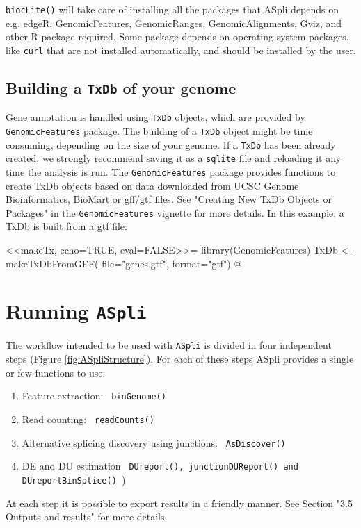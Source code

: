 \documentclass{article}
\begin{document}
\texttt{biocLite()} will take care of installing all the packages that ASpli 
depends on e.g. edgeR, GenomicFeatures, GenomicRanges, GenomicAlignments, Gviz, 
and other R package required. Some package depends on operating system packages,
like \texttt{curl} that are not installed automatically, and should be installed
by the user.

\subsection{ Building a \texttt{TxDb} of your genome }
Gene annotation is handled using \texttt{TxDb} objects, which are provided by
\texttt{GenomicFeatures} package. The building of a \texttt{TxDb} object might 
be time consuming, depending on the size of your genome. If a \texttt{TxDb} has
been already created, we strongly recommend saving it as a \texttt{sqlite} file
and reloading it any time the analysis is run. The \texttt{GenomicFeatures} 
package provides functions to create TxDb objects based on data downloaded from
UCSC Genome Bioinformatics, BioMart or gff/gtf files. See "Creating New TxDb 
Objects or Packages" in the \texttt{GenomicFeatures} vignette for more details.
In this example, a TxDb is built from a gtf file:

<<makeTx, echo=TRUE, eval=FALSE>>=
library(GenomicFeatures)
TxDb <- makeTxDbFromGFF(
  file="genes.gtf",
  format="gtf")
@



\section{Running \texttt{ASpli}}

The workflow intended to be used with \texttt{ASpli} is divided in four
independent steps (Figure \ref{fig:ASpliStructure}). For each of these steps
ASpli provides a single or few functions to use:
\begin{enumerate}
  \item Feature extraction: \texttt{ binGenome() }
  \item Read counting: \texttt{ readCounts() }
  \item Alternative splicing discovery using junctions: \texttt{ AsDiscover() }
  \item DE and DU estimation \texttt{ DUreport(), junctionDUReport() and
  DUreportBinSplice() })
\end{enumerate}

At each step it is possible to export results in a friendly manner. 
See Section "3.5 Outputs and results" for more details.
\end{document}
